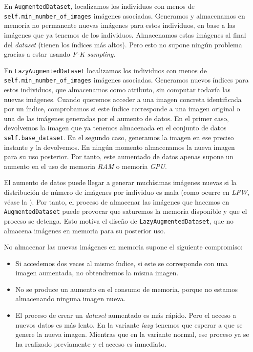 En \lstinline{AugmentedDataset}, localizamos los individuos con menos de \lstinline{self.min_number_of_images} imágenes asociadas. Generamos y almacenamos en memoria no permanente nuevas imágenes para estos individuos, en base a las imágenes que ya tenemos de los individuos. Almacenamos estas imágenes al final del \textit{dataset} (tienen los índices más altos). Pero esto no supone ningún problema gracias a estar usando \textit{P-K sampling}.

En \lstinline{LazyAugmentedDataset} localizamos los individuos con menos de \lstinline{self.min_number_of_images} imágenes asociadas. Generamos nuevos índices para estos individuos, que almacenamos como atributo, sin computar todavía las nuevas imágenes. Cuando queremos acceder a una imagen concreta identificada por un índice, comprobamos si este índice corresponde a una imagen original o una de las imágenes generadas por el aumento de datos. En el primer caso, devolvemos la imagen que ya tenemos almacenada en el conjunto de datos \lstinline{self.base_dataset}. En el segundo caso, generamos la imagen en ese preciso instante y la devolvemos. En ningún momento almacenamos la nueva imagen para su uso posterior. Por tanto, este aumentado de datos apenas supone un aumento en el uso de memoria \textit{RAM} o memoria \textit{GPU}.

El aumento de datos puede llegar a generar muchísimas imágenes nuevas si la distribución de número de imágenes por individuo es mala (como ocurre en \textit{LFW}, véase la ). Por tanto, el proceso de almacenar las imágenes que hacemos en \lstinline{AugmentedDataset} puede provocar que saturemos la memoria disponible y que el proceso se detenga. Esto motiva el diseño de \lstinline{LazyAugmentedDataset}, que no almacena imágenes en memoria para su posterior uso.

No almacenar las nuevas imágenes en memoria supone el siguiente compromiso:

\begin{itemize}
	\item Si accedemos dos veces al mismo índice, si este se corresponde con una imagen aumentada, no obtendremos la misma imagen.
	\item No se produce un aumento en el consumo de memoria, porque no estamos almacenando ninguna imagen nueva.
	\item El proceso de crear un \textit{dataset} aumentado es más rápido. Pero el acceso a nuevos datos es más lento. En la variante \textit{lazy} tenemos que esperar a que se genere la nueva imagen. Mientras que en la variante normal, ese proceso ya se ha realizado previamente y el acceso es inmediato.
\end{itemize}

